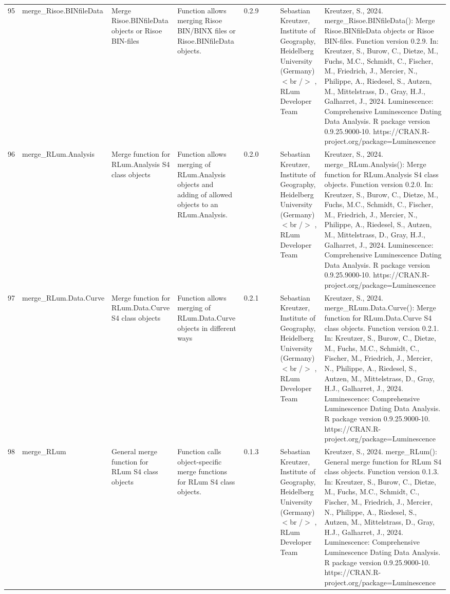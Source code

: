 \begin{table}[ht]
\begin{tabular}{rllllllll}
  95 & merge\_Risoe.BINfileData & Merge Risoe.BINfileData objects or Risoe BIN-files & Function allows merging Risoe BIN/BINX files or  Risoe.BINfileData  objects. & 0.2.9
 &  &  & Sebastian Kreutzer, Institute of Geography, Heidelberg University (Germany)$<$br /$>$ , RLum Developer Team & Kreutzer, S., 2024. merge\_Risoe.BINfileData(): Merge Risoe.BINfileData objects or Risoe BIN-files. Function version 0.2.9. In: Kreutzer, S., Burow, C., Dietze, M., Fuchs, M.C., Schmidt, C., Fischer, M., Friedrich, J., Mercier, N., Philippe, A., Riedesel, S., Autzen, M., Mittelstrass, D., Gray, H.J., Galharret, J., 2024. Luminescence: Comprehensive Luminescence Dating Data Analysis. R package version 0.9.25.9000-10. https://CRAN.R-project.org/package=Luminescence
 \\ 
  96 & merge\_RLum.Analysis & Merge function for RLum.Analysis S4 class objects & Function allows merging of RLum.Analysis objects and adding of allowed objects to an RLum.Analysis. & 0.2.0
 &  &  & Sebastian Kreutzer, Institute of Geography, Heidelberg University (Germany)$<$br /$>$ , RLum Developer Team & Kreutzer, S., 2024. merge\_RLum.Analysis(): Merge function for RLum.Analysis S4 class objects. Function version 0.2.0. In: Kreutzer, S., Burow, C., Dietze, M., Fuchs, M.C., Schmidt, C., Fischer, M., Friedrich, J., Mercier, N., Philippe, A., Riedesel, S., Autzen, M., Mittelstrass, D., Gray, H.J., Galharret, J., 2024. Luminescence: Comprehensive Luminescence Dating Data Analysis. R package version 0.9.25.9000-10. https://CRAN.R-project.org/package=Luminescence
 \\ 
  97 & merge\_RLum.Data.Curve & Merge function for RLum.Data.Curve S4 class objects & Function allows merging of RLum.Data.Curve objects in different ways & 0.2.1
 &  &  & Sebastian Kreutzer, Institute of Geography, Heidelberg University (Germany)$<$br /$>$ , RLum Developer Team & Kreutzer, S., 2024. merge\_RLum.Data.Curve(): Merge function for RLum.Data.Curve S4 class objects. Function version 0.2.1. In: Kreutzer, S., Burow, C., Dietze, M., Fuchs, M.C., Schmidt, C., Fischer, M., Friedrich, J., Mercier, N., Philippe, A., Riedesel, S., Autzen, M., Mittelstrass, D., Gray, H.J., Galharret, J., 2024. Luminescence: Comprehensive Luminescence Dating Data Analysis. R package version 0.9.25.9000-10. https://CRAN.R-project.org/package=Luminescence
 \\ 
  98 & merge\_RLum & General merge function for RLum S4 class objects & Function calls object-specific merge functions for RLum S4 class objects. & 0.1.3
 &  &  & Sebastian Kreutzer, Institute of Geography, Heidelberg University (Germany)$<$br /$>$ , RLum Developer Team & Kreutzer, S., 2024. merge\_RLum(): General merge function for RLum S4 class objects. Function version 0.1.3. In: Kreutzer, S., Burow, C., Dietze, M., Fuchs, M.C., Schmidt, C., Fischer, M., Friedrich, J., Mercier, N., Philippe, A., Riedesel, S., Autzen, M., Mittelstrass, D., Gray, H.J., Galharret, J., 2024. Luminescence: Comprehensive Luminescence Dating Data Analysis. R package version 0.9.25.9000-10. https://CRAN.R-project.org/package=Luminescence

\end{tabular}
\end{table}
